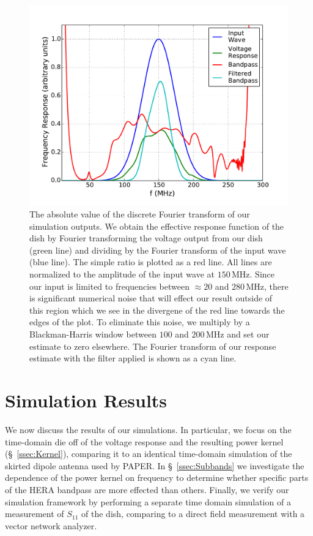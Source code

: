 \documentclass[twocolumn]{emulateapj}
\begin{document}
\begin{figure}[h!]
\includegraphics[width=.5\textwidth]{figures/frequency_domain.pdf}
\caption{The absolute value of the discrete Fourier transform of our simulation outputs. We obtain the effective response function of the dish by Fourier transforming the voltage output from our dish (green line) and dividing by the Fourier transform of the input wave (blue line). The simple ratio is plotted as a red line. All lines are normalized to the amplitude of the input wave at $150$\,MHz. Since our input is limited to frequencies between $\approx 20$ and $280$\,MHz, there is significant numerical noise that will effect our result outside of this region which we see in the divergene of the red line towards the edges of the plot. To eliminate this noise, we multiply by a Blackman-Harris window between $100$ and $200$\,MHz and set our estimate to zero elsewhere. The Fourier transform of our response estimate with the filter applied is shown as a cyan line.}
\label{fig:FrequencyDomain}
\end{figure}


\section{Simulation Results}\label{sec:Results}

We now discuss the results of our simulations. In particular, we focus on the time-domain die off of the voltage response and the resulting power kernel (\S~\ref{ssec:Kernel}), comparing it to an identical time-domain simulation of the skirted dipole antenna used by PAPER. In \S~\ref{ssec:Subbands} we investigate the dependence of the power kernel on frequency to determine whether specific parts of the HERA bandpass are more effected than others. Finally, we verify our simulation framework by performing a separate time domain simulation of a measurement of $S_{11}$ of the dish, comparing to a direct field measurement with a vector network analyzer. 
\end{document}
